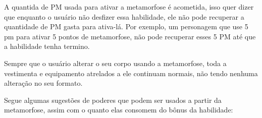 
	

A quantida de PM usada para ativar a metamorfose é acometida, isso quer dizer que enquanto o usuário não desfizer essa habilidade, ele não pode recuperar a quantidade de PM gasta para ativa-lá. Por exemplo, um personagem que use 5 pm para ativar 5 pontos de metamorfose, não pode recuperar esses 5 PM até que a habilidade tenha termino.
	
	Sempre que o usuário alterar o seu corpo usando a metamorfose, toda a vestimenta e equipamento atrelados a ele continuam normais, não tendo nenhuma alteração no seu formato.

	Segue algumas sugestões de poderes que podem ser usados a partir da metamorfose, assim com o quanto elas consomem do bônus da habilidade:

